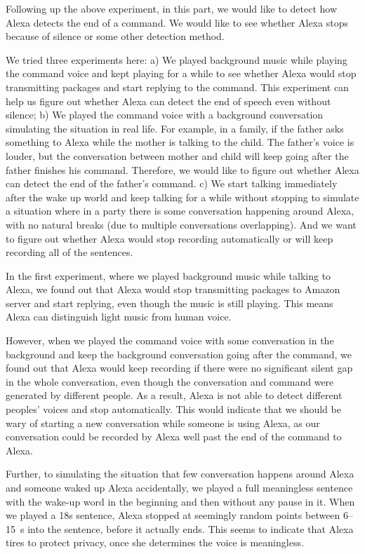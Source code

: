 Following up the above experiment, in this part, we would like to detect how Alexa detects the end of a command. We would like to see whether Alexa stops because of silence or some other detection method.

We tried three experiments here: a) We played background music while playing the command voice and kept playing for a while to see whether Alexa would stop transmitting packages and start replying to the command. This experiment can help us figure out whether Alexa can detect the end of speech even without silence; b) We played the command voice with a background conversation simulating the situation in real life. For example, in a family, if the  father asks something to Alexa while the mother is talking to the child. The father's voice is louder, but the conversation between mother and child will keep going after the father finishes his command. Therefore, we would like to figure out whether Alexa can detect the end of the father's command. c) We start talking immediately after the wake up world and keep talking for a while without stopping to simulate a situation where in a party there is some conversation happening around Alexa, with no natural breaks (due to multiple conversations overlapping). And we want to figure out whether Alexa would stop recording automatically or will keep recording all of the sentences.

In the first experiment, where we played background music while talking to Alexa, we found out that Alexa would stop transmitting packages to Amazon server and start replying, even though the music is still playing. This means Alexa can distinguish light music from human voice.

However, when we played the command voice with some conversation in the background and keep the background conversation going after the command, we found out that Alexa would keep recording if there were no significant silent gap in the whole conversation, even though the conversation and command were generated by different people. As a result, Alexa is not able to detect different peoples' voices and stop automatically. This would indicate that we should be wary of starting a new conversation while someone is using Alexa, as our conversation could be recorded by Alexa well past the end of the command to Alexa. 

Further, to simulating the situation that few conversation happens around Alexa and someone waked up Alexa accidentally, we played a full meaningless sentence with the wake-up word in the beginning and then without any pause in it. When we played a 18s sentence, Alexa stopped at seemingly random points between 6--15~s into the sentence, before it actually ends. This seems to indicate that Alexa tires to protect privacy, once she determines the voice is meaningless.


